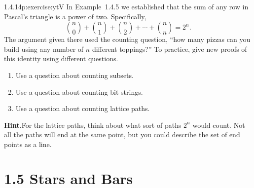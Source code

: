 \documentclass[twoside,11pt,]{book}
\newcommand{\blocktitlefont}{\relax}
\numberwithin{equation}{chapter}
\begin{document}
\begin{divisionsolution}{1.4.14}{}{p:exercise:ytV}%
In Example~1.4.5 we established that the sum of any row in Pascal's triangle is a power of two.  Specifically,%
\begin{equation*}
{n\choose 0} + {n \choose 1} + {n\choose 2} + \cdots + {n \choose n} = 2^n\text{.}
\end{equation*}
The argument given there used the counting question, ``how many pizzas can you build using any number of \(n\) different toppings?''  To practice, give new proofs of this identity using different questions.%
\begin{enumerate}[label=(\alph*)]
\item{}Use a question about counting subsets.%
\item{}Use a question about counting bit strings.%
\item{}Use a question about counting lattice paths.%
\end{enumerate}
%
\par\smallskip%
\noindent\textbf{\blocktitlefont Hint}.\quad{}For the lattice paths, think about what sort of paths \(2^n\) would count.  Not all the paths will end at the same point, but you could describe the set of end points as a line.%
\end{divisionsolution}%
\section*{1.5 Stars and Bars}
\end{document}
